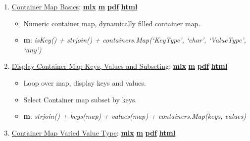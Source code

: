 \documentclass[
]{book}
\providecommand{\tightlist}{%
  \setlength{\itemsep}{0pt}\setlength{\parskip}{0pt}}
\begin{document}
\begin{enumerate}
\def\labelenumi{\arabic{enumi}.}
\tightlist
\item
  \href{https://fanwangecon.github.io/M4Econ/amto/container/htmlpdfm/fs_container.html}{Container Map Basics}: \href{https://github.com/FanWangEcon/M4Econ/blob/master/amto/container/fs_container.mlx}{\textbf{mlx}} \textbar{} \href{https://github.com/FanWangEcon/M4Econ/blob/master/amto/container/htmlpdfm/fs_container.m}{\textbf{m}} \textbar{} \href{https://github.com/FanWangEcon/M4Econ/blob/master/amto/container/htmlpdfm/fs_container.pdf}{\textbf{pdf}} \textbar{} \href{https://fanwangecon.github.io/M4Econ/amto/container/htmlpdfm/fs_container.html}{\textbf{html}}

  \begin{itemize}
  \tightlist
  \item
    Numeric container map, dynamically filled container map.
  \item
    \textbf{m}: \emph{isKey() + strjoin() + containers.Map(`KeyType', `char', `ValueType', `any')}
  \end{itemize}
\item
  \href{https://fanwangecon.github.io/M4Econ/amto/container/htmlpdfm/fs_containermap.html}{Display Container Map Keys, Values and Subseting}: \href{https://github.com/FanWangEcon/M4Econ/blob/master/amto/container/fs_containermap.mlx}{\textbf{mlx}} \textbar{} \href{https://github.com/FanWangEcon/M4Econ/blob/master/amto/container/htmlpdfm/fs_containermap.m}{\textbf{m}} \textbar{} \href{https://github.com/FanWangEcon/M4Econ/blob/master/amto/container/htmlpdfm/fs_containermap.pdf}{\textbf{pdf}} \textbar{} \href{https://fanwangecon.github.io/M4Econ/amto/container/htmlpdfm/fs_containermap.html}{\textbf{html}}

  \begin{itemize}
  \tightlist
  \item
    Loop over map, display keys and values.
  \item
    Select Container map subset by keys.
  \item
    \textbf{m}: \emph{strjoin() + keys(map) + values(map) + containers.Map(keys, values)}
  \end{itemize}
\item
  \href{https://fanwangecon.github.io/M4Econ/amto/container/htmlpdfm/fs_map_anytype.html}{Container Map Varied Value Type}: \href{https://github.com/FanWangEcon/M4Econ/blob/master/amto/container/fs_map_anytype.mlx}{\textbf{mlx}} \textbar{} \href{https://github.com/FanWangEcon/M4Econ/blob/master/amto/container/htmlpdfm/fs_map_anytype.m}{\textbf{m}} \textbar{} \href{https://github.com/FanWangEcon/M4Econ/blob/master/amto/container/htmlpdfm/fs_map_anytype.pdf}{\textbf{pdf}} \textbar{} \href{https://fanwangecon.github.io/M4Econ/amto/container/htmlpdfm/fs_map_anytype.html}{\textbf{html}}


\end{enumerate}
\end{document}

